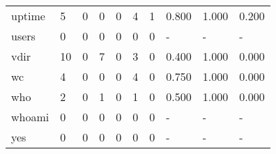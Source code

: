\begin{longtable}{lp{2.0cm}p{2.0cm}p{2.0cm}p{2.0cm}p{2.0cm}p{2.0cm}p{2.0cm}p{2.0cm}p{2.0cm}}
uptime    &                      5 &                                  0 &                                 0 &                                0 &                                 4 &                               1 &                                0.800 &                                  1.000 &                                0.200 \\
users     &                      0 &                                  0 &                                 0 &                                0 &                                 0 &                               0 &                                    - &                                      - &                                    - \\
vdir      &                     10 &                                  0 &                                 7 &                                0 &                                 3 &                               0 &                                0.400 &                                  1.000 &                                0.000 \\
wc        &                      4 &                                  0 &                                 0 &                                0 &                                 4 &                               0 &                                0.750 &                                  1.000 &                                0.000 \\
who       &                      2 &                                  0 &                                 1 &                                0 &                                 1 &                               0 &                                0.500 &                                  1.000 &                                0.000 \\
whoami    &                      0 &                                  0 &                                 0 &                                0 &                                 0 &                               0 &                                    - &                                      - &                                    - \\
yes       &                      0 &                                  0 &                                 0 &                                0 &                                 0 &                               0 &                                    - &                                      - &                                    - \\
\end{longtable}
